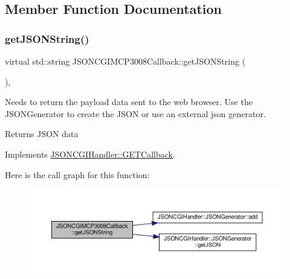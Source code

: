 \subsection{Member Function Documentation}
\mbox{\label{classJSONCGIMCP3008Callback_aac6e6543d0b4da62f72781f3fe47ebed}} 
\subsubsection{\texorpdfstring{get\+J\+S\+O\+N\+String()}{getJSONString()}}
{\footnotesize\ttfamily virtual std\+::string J\+S\+O\+N\+C\+G\+I\+M\+C\+P3008\+Callback\+::get\+J\+S\+O\+N\+String (\begin{DoxyParamCaption}{ }\end{DoxyParamCaption})\hspace{0.3cm}{\ttfamily [inline]}, {\ttfamily [virtual]}}

Needs to return the payload data sent to the web browser. Use the J\+S\+O\+N\+Generator to create the J\+S\+ON or use an external json generator. \begin{DoxyReturn}{Returns}
J\+S\+ON data 
\end{DoxyReturn}


Implements \hyperlink{classJSONCGIHandler_1_1GETCallback_a2367bf5a5912e9e5599ee464e0846255}{J\+S\+O\+N\+C\+G\+I\+Handler\+::\+G\+E\+T\+Callback}.

Here is the call graph for this function\+:
\nopagebreak
\begin{figure}[H]
\begin{center}
\leavevmode
\includegraphics[width=350pt]{classJSONCGIMCP3008Callback_aac6e6543d0b4da62f72781f3fe47ebed_cgraph}
\end{center}
\end{figure}


